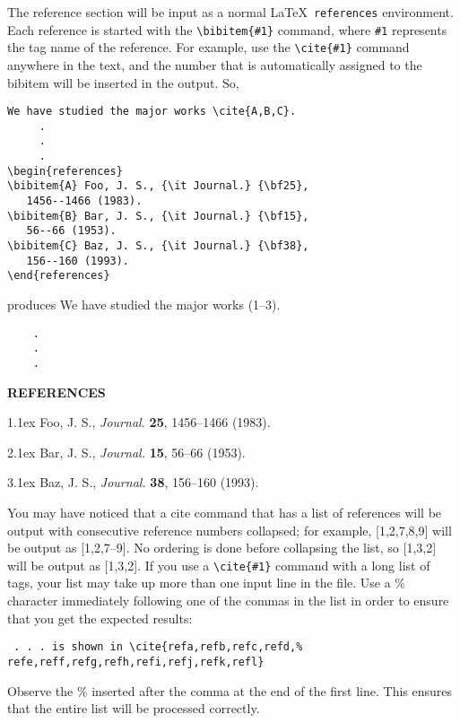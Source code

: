 The reference section will be input as a normal \LaTeX\
\verb+references+ environment. Each reference is started with the 
\verb+\bibitem{#1}+ command, where \verb+#1+ 
represents the tag name of the reference. For example, use the
\verb+\cite{#1}+ command anywhere in the text, and the number that is
automatically assigned to the bibitem will be inserted in the output. So,
\se\begin{verbatim}
We have studied the major works \cite{A,B,C}.
     .
     .
     .
\begin{references}
\bibitem{A} Foo, J. S., {\it Journal.} {\bf25},
   1456--1466 (1983).
\bibitem{B} Bar, J. S., {\it Journal.} {\bf15},
   56--66 (1953).
\bibitem{C} Baz, J. S., {\it Journal.} {\bf38},
   156--160 (1993).
\end{references}
\end{verbatim}\ee
\noindent produces
\se
We have studied the major works (1--3).
\begin{verbatim}
    .
    .
    .
\end{verbatim}
\begin{center}
\bf REFERENCES
\end{center}
\vskip1pc \small \parindent0pt
1.\kern1ex  Foo, J. S., {\it Journal.} {\bf25}, 1456--1466 (1983).\par
2.\kern1ex  Bar, J. S., {\it Journal.} {\bf15}, 56--66 (1953).  \par
3.\kern1ex  Baz, J. S., {\it Journal.} {\bf38}, 156--160 (1993). \par
\ee
You may have noticed that
a cite command that has a list of references will be output with
consecutive reference numbers collapsed; for example, [1,2,7,8,9] will be
output as [1,2,7--9]. No ordering is done before collapsing the list,
so [1,3,2] will be
output as [1,3,2]. If you use a \verb+\cite{#1}+ command with a long list
of tags, your list may take up more than one input line in
the file. Use a \%
character immediately following one of the commas in the list in order to
ensure that you  get the expected results:
\begin{verbatim}
 . . . is shown in \cite{refa,refb,refc,refd,%
refe,reff,refg,refh,refi,refj,refk,refl}
\end{verbatim}
Observe the \% inserted after the comma at the end of
 the first line. This ensures that
the entire list will be processed correctly.

